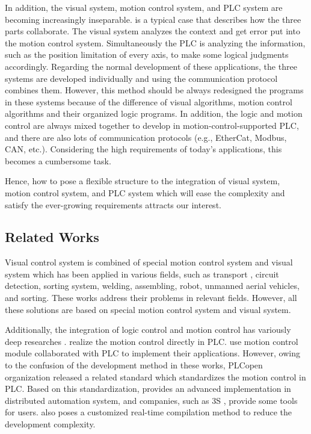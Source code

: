 \documentclass[journal,UTF8]{IEEEtran}
\begin{document}
In addition, the visual system, motion control system, and PLC system are becoming increasingly inseparable. \cite{Chen2014A} is a typical case that describes how the three parts collaborate. The visual system analyzes the context and get error put into the motion control system. Simultaneously the PLC is analyzing the information, such as the position limitation of every axis, to make some logical judgments accordingly. Regarding the normal development of these applications, the three systems are developed individually and using the communication protocol combines them. However, this method should be always redesigned the programs in these systems because of the difference of visual algorithms, motion control algorithms and their organized logic programs. In addition, the logic and motion control are always mixed together to develop in motion-control-supported PLC, and there are also lots of communication protocols (e.g., EtherCat, Modbus, CAN, etc.). Considering the high requirements of today’s applications, this becomes a cumbersome task.

Hence, how to pose a flexible structure to the integration of visual system, motion control system, and PLC system which will ease the complexity and satisfy the ever-growing requirements attracts our interest.

\subsection{Related Works}

Visual control system is combined of special motion control system and visual system which has been applied in various fields, such as transport \cite{Xing2014Intersection}, circuit detection\cite{Nian2005An}, sorting system, welding\cite{Chen2014A}, assembling\cite{Wang2008Visual,Xiao2014Visual}, robot\cite{Wu2013Cloud,Tsai2017A}, unmanned aerial vehicles\cite{Guenard2010A,Serra2016Landing}, and sorting\cite{Sun2013Automatic}. These works address their problems in relevant fields. However, all these solutions are based on special motion control system and visual system.

Additionally, the integration of logic control and motion control has variously deep researches \cite{Ioannides2004Design,Shi2016The,Fang2017Design, syaichu2011model}. \cite{Ioannides2004Design,syaichu2011model} realize the motion control directly in PLC. \cite{Peng2011Linear, Qian2014A, OMRON2006CS1W} use motion control module collaborated with PLC to implement their applications. However, owing to the confusion of the development method in these works, PLCopen organization released a related standard \cite{PLCopen2005Function} which standardizes the motion control in PLC. Based on this standardization, \cite{S2006Advanced} provides an advanced implementation in distributed automation system, and companies, such as 3S \cite{3S2017Logic}, provide some tools for users. \cite{wu2018customized} also poses a customized real-time compilation method to reduce the development complexity.
\end{document}
